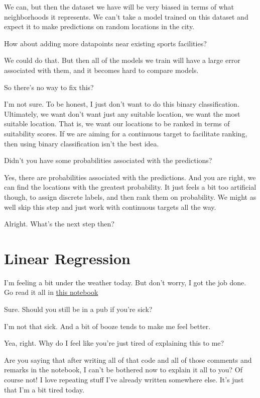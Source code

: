 We can, but then the dataset we have will be very biased in terms of what neighborhoods it represents. We can't take a model trained on this dataset and expect it to make predictions on random locations in the city. 

{\color{blue} How about adding more datapoints near existing sports facilities?}

We could do that. But then all of the models we train will have a large error associated with them, and it becomes hard to compare models. 

{\color{blue} So there's no way to fix this?}

I'm not sure. To be honest, I just don't want to do this binary classification. Ultimately, we want don't want just any suitable location, we want the most suitable location. That is, we want our locations to be ranked in terms of suitability scores. If we are aiming for a continuous target to facilitate ranking, then using binary classification isn't the best idea. 

{\color{blue} Didn't you have some probabilities associated with the predictions?}

Yes, there are probabilities associated with the predictions. And you are right, we can find the locations with the greatest probability. It just feels a bit too artificial though, to assign discrete labels, and then rank them on probability. We might as well skip this step and just work with continuous targets all the way. 

{\color{blue} Alright. What's the next step then?}


\section{Linear Regression}

I'm feeling a bit under the weather today. But don't worry, I got the job done. Go read it all in \href{https://github.com/saba-vadarevu/IBM-dataScience-Capstone/blob/master/final/model_continuous.ipynb}{this notebook}

{\color{blue} Sure. Should you still be in a pub if you're sick?}

I'm not that sick. And a bit of booze tends to make me feel better. 

{\color{blue} Yea, right. Why do I feel like you're just tired of explaining this to me?}

Are you saying that after writing all of that code and all of those comments and remarks in the notebook, I can't be bothered now to explain it all to you? Of course not! I love repeating stuff I've already written somewhere else. It's just that I'm a bit tired today. 

